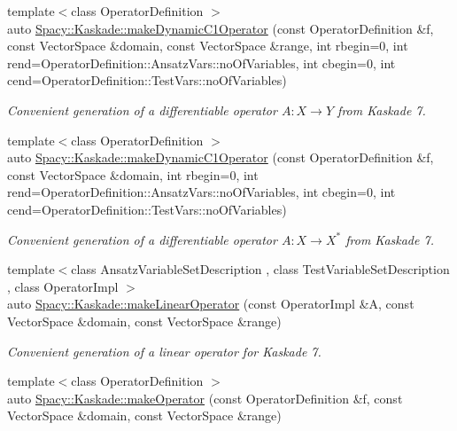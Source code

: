 \begin{DoxyCompactItemize}
{\footnotesize template$<$class Operator\+Definition $>$ }\\auto \hyperlink{group__KaskadeGroup_gac4502ad2f54b2c7d82e2a5d5790dc8b6_gac4502ad2f54b2c7d82e2a5d5790dc8b6}{Spacy\+::\+Kaskade\+::make\+Dynamic\+C1\+Operator} (const Operator\+Definition \&f, const Vector\+Space \&domain, const Vector\+Space \&range, int rbegin=0, int rend=Operator\+Definition\+::\+Ansatz\+Vars\+::no\+Of\+Variables, int cbegin=0, int cend=Operator\+Definition\+::\+Test\+Vars\+::no\+Of\+Variables)
\begin{DoxyCompactList}\small\item\em Convenient generation of a differentiable operator $A: X\rightarrow Y$ from Kaskade 7. \end{DoxyCompactList}\item 
{\footnotesize template$<$class Operator\+Definition $>$ }\\auto \hyperlink{group__KaskadeGroup_gacb385469fa2c1465b9ed8cbe6fabc13c_gacb385469fa2c1465b9ed8cbe6fabc13c}{Spacy\+::\+Kaskade\+::make\+Dynamic\+C1\+Operator} (const Operator\+Definition \&f, const Vector\+Space \&domain, int rbegin=0, int rend=Operator\+Definition\+::\+Ansatz\+Vars\+::no\+Of\+Variables, int cbegin=0, int cend=Operator\+Definition\+::\+Test\+Vars\+::no\+Of\+Variables)
\begin{DoxyCompactList}\small\item\em Convenient generation of a differentiable operator $A: X\rightarrow X^*$ from Kaskade 7. \end{DoxyCompactList}\item 
{\footnotesize template$<$class Ansatz\+Variable\+Set\+Description , class Test\+Variable\+Set\+Description , class Operator\+Impl $>$ }\\auto \hyperlink{group__KaskadeGroup_ga6bd8e1d7fdd3066ecd7ed14f0a239912_ga6bd8e1d7fdd3066ecd7ed14f0a239912}{Spacy\+::\+Kaskade\+::make\+Linear\+Operator} (const Operator\+Impl \&A, const Vector\+Space \&domain, const Vector\+Space \&range)
\begin{DoxyCompactList}\small\item\em Convenient generation of a linear operator for Kaskade 7. \end{DoxyCompactList}\item 
{\footnotesize template$<$class Operator\+Definition $>$ }\\auto \hyperlink{group__KaskadeGroup_ga0e8d7d2c51e429e22561ef813fc97589_ga0e8d7d2c51e429e22561ef813fc97589}{Spacy\+::\+Kaskade\+::make\+Operator} (const Operator\+Definition \&f, const Vector\+Space \&domain, const Vector\+Space \&range)

\end{DoxyCompactItemize}
